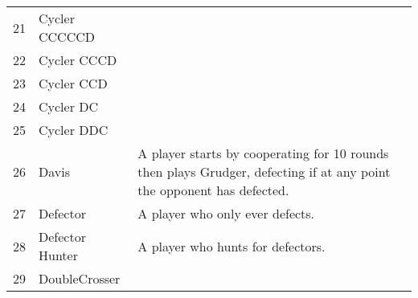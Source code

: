 \begin{table}[H]
\begin{adjustbox}{height=0.8\textwidth, width=1.1\textwidth}
\begin{tabular}{rlll}
	21   & Cycler CCCCCD               &                                                                                                                                   \\
	22   & Cycler CCCD                 &                                                                                                                                   \\
	23   & Cycler CCD                  &                                                                                                                                   \\
	24   & Cycler DC                   &                                                                                                                                   \\
	25   & Cycler DDC                  &                                                                                                                                   \\
	26   & Davis                       & A player starts by cooperating for 10 rounds then plays Grudger,
	defecting if at any point the opponent has defected.                                                                                                                                                                                                                                                                                                                                                                                                                                                                                                                                                                                                                                                                                                                                                                                                                                                                                                \\
	27   & Defector                    & A player who only ever defects.                                                                                                   \\
	28   & Defector Hunter             & A player who hunts for defectors.                                                                                                 \\
	29   & DoubleCrosser               &                                                                                                                                   \\

\end{tabular}
\end{adjustbox}
\end{table}
